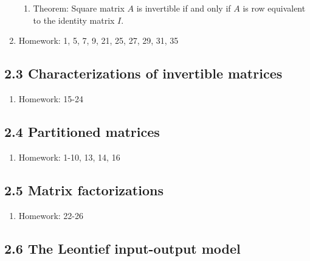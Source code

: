 \documentclass{article}
\begin{document}
\begin{enumerate}
\begin{enumerate}
\item Theorem: Square matrix $A$ is invertible if and only if $A$ is row equivalent to the identity matrix $I$. 

\end{enumerate}

\item Homework: 1, 5, 7, 9, 21, 25, 27, 29, 31, 35

\end{enumerate}

\subsection{2.3 Characterizations of invertible matrices}

\begin{enumerate}

\item Homework: 15-24

\end{enumerate}

\subsection{2.4 Partitioned matrices}

\begin{enumerate}

\item Homework: 1-10, 13, 14, 16

\end{enumerate}

\subsection{2.5 Matrix factorizations}

\begin{enumerate}

\item Homework: 22-26

\end{enumerate}

\subsection{2.6 The Leontief input-output model}
\end{document}
